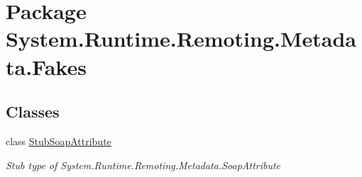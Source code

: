 \hypertarget{namespace_system_1_1_runtime_1_1_remoting_1_1_metadata_1_1_fakes}{\section{Package System.\-Runtime.\-Remoting.\-Metadata.\-Fakes}
\label{namespace_system_1_1_runtime_1_1_remoting_1_1_metadata_1_1_fakes}
}
\subsection*{Classes}
\begin{DoxyCompactItemize}
\item 
class \hyperlink{class_system_1_1_runtime_1_1_remoting_1_1_metadata_1_1_fakes_1_1_stub_soap_attribute}{Stub\-Soap\-Attribute}
\begin{DoxyCompactList}\small\item\em Stub type of System.\-Runtime.\-Remoting.\-Metadata.\-Soap\-Attribute\end{DoxyCompactList}\end{DoxyCompactItemize}
